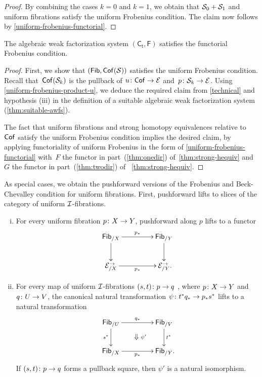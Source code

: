 \documentclass[reqno,10pt,a4paper,oneside,draft]{amsart}
\begin{document}
{{\begin{proof}
By combining the cases $k = 0$ and $k = 1$, we obtain that $\cal{S}_0 + \cal{S}_1$ and uniform fibrations satisfy the uniform Frobenius
condition. The claim now follows by \cref{uniform-frobenius-functorial}.
\end{proof}


\begin{theorem} \label{uniform-fibrations-uniform-frobenius}
The algebraic weak factorization system $(\mathsf{C_t}, \mathsf{F})$  satisfies the functorial Frobenius condition.
\end{theorem}


\begin{proof} First, we show that $(  \Fib, \Cof(\cal{S}))$
 satisfies the uniform Frobenius condition. Recall  that~$\Cof(\cal{S}_k)$ is the pullback of $u \co \Cof \to \cal{E}$ and~$p \co \cal{S}_k  \to \cal{E}$.
Using \cref{uniform-frobenius-product-u}, we deduce the required claim from \cref{technical} and hypothesis (iii) in the
definition of a suitable algebraic weak factorization system (\cref{thm:suitable-awfs}). 

The fact that uniform fibrations and strong homotopy equivalences relative to $\Cof$ satisfy the uniform Frobenius condition 
implies the desired claim, by applying functoriality of uniform Frobenius in the form of \cref{uniform-frobenius-functorial} with~$F$ 
the functor in part~(\ref{thm:onedir}) of~\cref{thm:strong-hequiv} and~$G$ the functor in part~(\ref{thm:twodir}) of ~\cref{thm:strong-hequiv}. 
\end{proof}


As special cases, we obtain the pushforward versions of the Frobenius and Beck-Chevalley condition for uniform fibrations.
First, pushforward lifts to slices of the category of uniform $\cal{I}$-fibrations.

\begin{corollary} \label{uniform-fibrations-frobenius-pushforward} \label{uniform-fibrations-BC-pushforward}
\hfill
\begin{enumerate}[(i)] 
\item For every uniform fibration
$p \co X \to Y$, pushforward along $p$ lifts to a functor
\[
\xymatrix@C+2em{
  \Fib_{/X}
  \ar[r]^{p_*}
  \ar[d]
&
  \Fib_{/Y}
  \ar[d]
\\
  \catE_{/X}^\to
  \ar[r]_{p_*}
&
  \catE_{/Y}^\to
\rlap{.}}
\]
\item For every map of uniform $\cal{I}$-fibrations $(s, t) \co p \to q$ , where $p \co X \to Y$ and $q \co U \to V$, the canonical natural transformation $\psi \co t^* q_* \to p_* s^*$ lifts to a natural transformation
\[
\xymatrix@C+2em{
  \Fib_{/U}
  \ar[r]^{q_*}
  \ar[d]_{s^*}
  \ar@{}[dr]|{\textstyle\Downarrow \rlap{$\labelstyle \psi'$}}
&
  \Fib_{/V}
  \ar[d]^{t^*}
\\
  \Fib_{/X}
  \ar[r]_{p_*}
&
  \Fib_{/Y}
\rlap{.}}
\]
If $(s, t) \co p \to q$ forms a pullback square, then $\psi'$ is a natural isomorphism.
\end{enumerate}
\end{corollary}


}}
\end{document}
